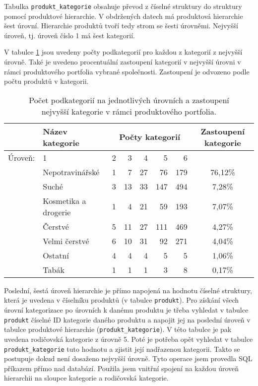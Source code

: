 Tabulka \texttt{produkt\_kategorie} obsahuje převod z číselné struktury do struktury pomocí produktové hierarchie. V obdržených datech má produktová hierarchie šest úrovní. Hierarchie produktů tvoří tedy strom se šesti úrovněmi. Nejvyšší úroveň, tj. úroveň číslo 1 má šest kategorií.

V tabulce \ref*{tab:d:4Bzast} jsou uvedeny počty podkategorií pro každou z kategorií z nejvyšší úrovně. Také je uvedeno procentuální zastoupení kategorií v nejvyšší úrovni v rámci produktového portfolia vybrané společnosti. Zastoupení je odvozeno podle počtu produktů v kategorii.

\begin{table}[hbtp!]
    \captionsetup{justification=centering}
    \begin{center}
    \caption{Počet podkategorií na jednotlivých úrovních a zastoupení \\ nejvyšší kategorie v rámci produktového portfolia.}
    \label{tab:d:4Bzast}
    \begin{tabular}{rp{4cm}  r r r r r  c}
        & Název kategorie & \multicolumn{5}{c}{Počty kategorií} &      Zastoupení kategorie      \\
        \midrule

        Úroveň: & 1       & 2    & 3   & 4   & 5    & 6    &  \\

        \midrule
        & Nepotravinářské    & 1     & 7    & 27   & 76    & 179   & 76,12\%              \\
        & Suché         & 3     & 13   & 33   & 147   & 494   & 7,28\%               \\
        & Kosmetika a drogerie        & 1     & 4    & 21   & 59    & 193   & 7,07\%               \\
        & Čerstvé       & 5     & 11   & 27   & 111   & 469   & 4,27\%               \\
        & Velmi čerstvé & 6     & 10   & 31   & 92    & 271   & 4,04\%               \\
        & Ostatní     & 4     & 4    & 4    & 5     & 5     & 1,06\%               \\
        & Tabák    & 1     & 1    & 1    & 3     & 8     & 0,17\%   \\
    \end{tabular}
    \end{center}
    \end{table}

Poslední, šestá úroveň hierarchie je přímo napojená na hodnotu číselné struktury, která je uvedena v číselníku produktů (v tabulce \texttt{produkt}). Pro získání všech úrovní kategorizace po úrovních k danému produktu je třeba vyhledat v tabulce \texttt{produkt} číselné ID kategorie daného produktu a napojit jej na poslední úroveň v tabulce produktové hierarchie (\texttt{produkt\_kategorie}). V této tabulce je pak uvedena rodičovská kategorie z úrovně 5. Poté je potřeba opět vyhledat v tabulce \texttt{produkt\_kategorie} tuto hodnotu a zjistit její nadřazenou kategorii. Takto se postupuje dokud není dosaženo nejvyšší úrovně. Tyto operace jsem provedla SQL příkazem přímo nad databází. Použila jsem vnitřní spojení na každou úroveň hierarchii na sloupce kategorie a rodičovská kategorie.

